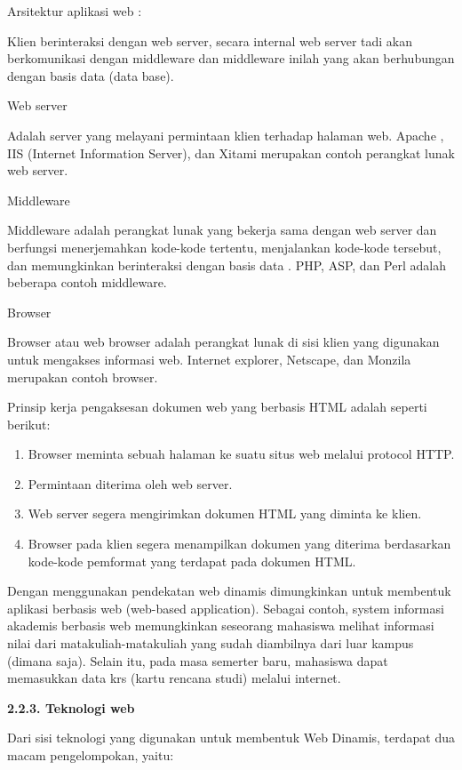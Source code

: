 \documentclass[11pt]{article}
\begin{document}
Arsitektur aplikasi web :

Klien berinteraksi dengan web server, secara internal web server tadi akan berkomunikasi dengan middleware dan middleware inilah yang akan berhubungan dengan basis data (data base).

Web server

Adalah server yang melayani permintaan klien terhadap halaman web. Apache , IIS (Internet Information Server), dan Xitami merupakan contoh perangkat lunak web server.

Middleware

Middleware adalah perangkat lunak yang bekerja sama dengan web server dan berfungsi menerjemahkan kode-kode tertentu, menjalankan kode-kode tersebut, dan memungkinkan berinteraksi dengan basis data . PHP, ASP, dan Perl adalah beberapa contoh middleware.

Browser

Browser atau web browser adalah perangkat lunak di sisi klien yang digunakan untuk mengakses informasi web. Internet explorer, Netscape, dan Monzila merupakan contoh browser.

Prinsip kerja pengaksesan dokumen web yang berbasis HTML adalah seperti berikut:

\begin{enumerate}
	\item Browser meminta sebuah halaman ke suatu situs web melalui protocol HTTP.
	\item Permintaan diterima oleh web server.
	\item Web server segera mengirimkan dokumen HTML yang diminta ke klien.
	\item Browser pada klien segera menampilkan dokumen yang diterima berdasarkan kode-kode pemformat yang terdapat pada dokumen HTML.
\end{enumerate}

Dengan menggunakan pendekatan web dinamis dimungkinkan untuk membentuk aplikasi berbasis web (web-based application). Sebagai contoh, system informasi akademis berbasis web memungkinkan seseorang mahasiswa melihat informasi nilai dari matakuliah-matakuliah yang sudah diambilnya dari luar kampus (dimana saja). Selain itu, pada masa semerter baru, mahasiswa dapat memasukkan data  krs (kartu rencana studi) melalui internet.

\textbf{2.2.3.	Teknologi web}

Dari sisi teknologi yang digunakan untuk membentuk Web Dinamis, terdapat dua macam pengelompokan, yaitu:
\end{document}
